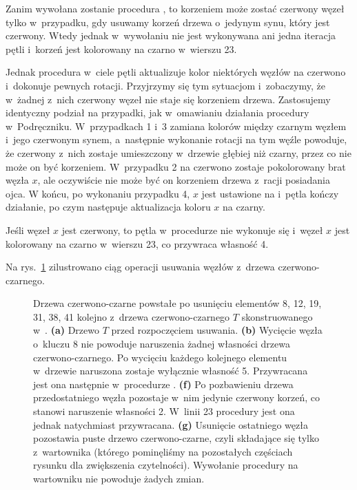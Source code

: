 
\exercise %
Zanim wywołana zostanie procedura , to korzeniem może zostać czerwony węzeł tylko w~przypadku, gdy usuwamy korzeń drzewa o~jedynym synu, który jest czerwony.
Wtedy jednak w~wywołaniu  nie jest wykonywana ani jedna iteracja pętli  i~korzeń jest kolorowany na czarno w~wierszu 23.

Jednak procedura  w~ciele pętli aktualizuje kolor niektórych węzłów na czerwono i~dokonuje pewnych rotacji.
Przyjrzymy się tym sytuacjom i~zobaczymy, że w~żadnej z~nich czerwony węzeł nie staje się korzeniem drzewa.
Zastosujemy identyczny podział na przypadki, jak w~omawianiu działania procedury w~Podręczniku.
W~przypadkach 1 i~3 zamiana kolorów między czarnym węzłem i~jego czerwonym synem, a~następnie wykonanie rotacji na tym węźle powoduje, że czerwony z~nich zostaje umieszczony w~drzewie głębiej niż czarny, przez co nie może on być korzeniem.
W~przypadku 2 na czerwono zostaje pokolorowany brat węzła $x$, ale oczywiście nie może być on korzeniem drzewa z~racji posiadania ojca.
W końcu, po wykonaniu przypadku 4, $x$ jest ustawione na  i~pętla kończy działanie, po czym następuje aktualizacja koloru $x$ na czarny.

\exercise %
Jeśli węzeł $x$ jest czerwony, to pętla  w~procedurze  nie wykonuje się i~węzeł $x$ jest kolorowany na czarno w~wierszu 23, co przywraca własność 4.

\exercise %
Na rys.\ \ref{fig:13.4-3} zilustrowano ciąg operacji usuwania węzłów z~drzewa czerwono-czarnego.
\begin{figure}[!ht]
	\centering 
	\caption{Drzewa czerwono-czarne powstałe po usunięciu elementów 8, 12, 19, 31, 38, 41 kolejno z~drzewa czerwono-czarnego $T$ skonstruowanego w~.
	{\sffamily\bfseries(a)} Drzewo $T$ przed rozpoczęciem usuwania.
	{\sffamily\bfseries(b)} Wycięcie węzła o~kluczu 8 nie powoduje naruszenia żadnej własności drzewa czerwono-czarnego.
	{\sffamily\bfseries{}} Po wycięciu każdego kolejnego elementu w~drzewie naruszona zostaje wyłącznie własność 5.
	Przywracana jest ona następnie w~procedurze .
	{\sffamily\bfseries{(f)}} Po pozbawieniu drzewa przedostatniego węzła pozostaje w~nim jedynie czerwony korzeń, co stanowi naruszenie własności 2.
        W~linii 23 procedury  jest ona jednak natychmiast przywracana.
        {\sffamily\bfseries{(g)}} Usunięcie ostatniego węzła pozostawia puste drzewo czerwono-czarne, czyli składające się tylko z~wartownika  (którego pominęliśmy na pozostałych częściach rysunku dla zwiększenia czytelności).
        Wywołanie procedury  na wartowniku nie powoduje żadych zmian.} \label{fig:13.4-3}
\end{figure}

